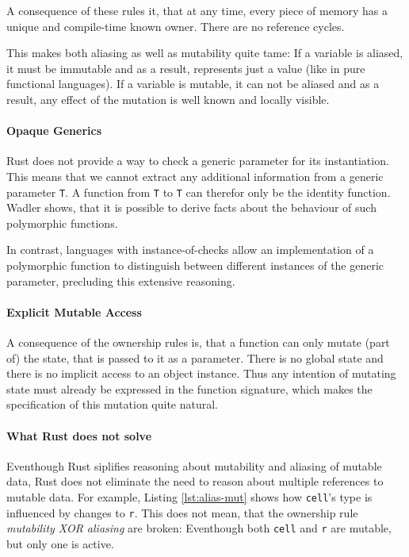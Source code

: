 \documentclass{article}
\newcommand{\code}[1]{\texttt{#1}}
\theoremstyle{definition}
\begin{document}
A consequence of these rules it, that at any time, every piece of memory has a unique and compile-time known owner. There are no reference cycles.

This makes both aliasing as well as mutability quite tame:
If a variable is aliased, it must be immutable and as a result, represents just a value (like in pure functional languages).
If a variable is mutable, it can not be aliased and as a result, any effect of the mutation is well known and locally visible.

\paragraph*{Opaque Generics} Rust does not provide a way to check a generic parameter for its instantiation. This means that we cannot extract any additional information from a generic parameter \code{T}. A function from \code{T} to \code{T} can therefor only be the identity function.
Wadler \cite{wadler_theorems_1989} shows, that it is possible to derive facts about the behaviour of such polymorphic functions.

In contrast, languages with instance-of-checks allow an implementation of a polymorphic function to distinguish between different instances of the generic parameter, precluding this extensive reasoning.

\paragraph*{Explicit Mutable Access} A consequence of the ownership rules is, that a function can only mutate (part of) the state, that is passed to it as a parameter. There is no global state and there is no implicit access to an object instance. Thus any intention of mutating state must already be expressed in the function signature, which makes the specification of this mutation quite natural.

\paragraph*{What Rust does not solve} Eventhough Rust siplifies reasoning about mutability and aliasing of mutable data, Rust does not eliminate the need to reason about multiple references to mutable data. For example, Listing \ref{lst:alias-mut} shows how \code{cell}'s type is influenced by changes to \code{r}. This does not mean, that the ownership rule  \textit{mutability XOR aliasing} are broken: Eventhough both \code{cell} and \code{r} are mutable, but only one is active.
\end{document}
